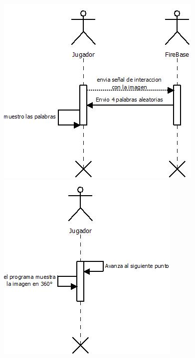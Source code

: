 \begin{figure}[H]
   \includegraphics[scale=0.6]{imgs/DS_3.jpeg}
   \includegraphics[scale=0.6]{imgs/DS_4.jpeg}
\end{figure}

